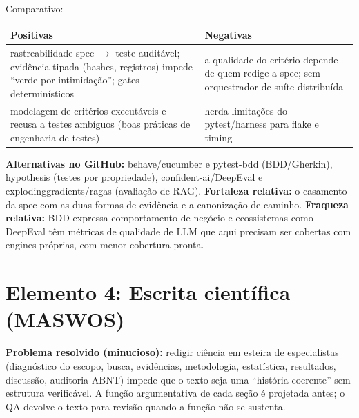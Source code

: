 \begin{resultado}
Comparativo:\par
\smallskip
{\footnotesize
\begin{tabularx}{\linewidth}{YY}
\toprule
Positivas & Negativas \\
\midrule
rastreabilidade spec $\to$ teste auditável; evidência tipada (hashes, registros)
impede ``verde por intimidação''; gates determinísticos & a qualidade do critério
depende de quem redige a spec; sem orquestrador de suíte distribuída \\
modelagem de critérios executáveis e recusa a testes ambíguos (boas práticas de
engenharia de testes) & herda limitações do pytest/harness para flake e timing \\
\bottomrule
\end{tabularx}\par}
\end{resultado}

\begin{metodo}
\textbf{Alternativas no GitHub:} behave/cucumber e pytest-bdd (BDD/Gherkin),
hypothesis (testes por propriedade), confident-ai/DeepEval e
explodinggradients/ragas (avaliação de RAG). \textbf{Fortaleza relativa:} o
casamento da spec com as duas formas de evidência e a canonização de caminho.
\textbf{Fraqueza relativa:} BDD expressa comportamento de negócio e ecossistemas
como DeepEval têm métricas de qualidade de LLM que aqui precisam ser cobertas com
engines próprias, com menor cobertura pronta.
\end{metodo}

\clearpage
\section{Elemento 4: Escrita científica (MASWOS)}


\begin{funcao}
\textbf{Problema resolvido (minucioso):} redigir ciência em esteira de
especialistas (diagnóstico do escopo, busca, evidências, metodologia,
estatística, resultados, discussão, auditoria ABNT) impede que o texto seja uma
``história coerente'' sem estrutura verificável. A função argumentativa de cada
seção é projetada antes; o QA devolve o texto para revisão quando a função não se
sustenta.
\end{funcao}

